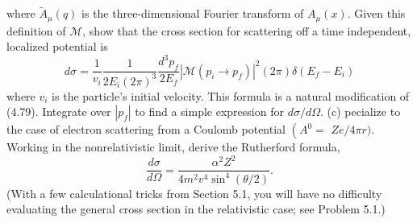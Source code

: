 \documentclass[hyperref, a4paper]{article}
\begin{document}
where $\widetilde{A}_{\mu}(q)$ is the three-dimensional Fourier transform of $A_{\mu}(x)$. Given this definition of $\mathcal{M}$, show that the cross section for scattering off a time independent, localized potential is
\begin{equation}
    d \sigma=\frac{1}{v_{i}} \frac{1}{2 E_{i}(2 \pi)^{3}} \frac{d^{3} p_{f}}{2 E_{f}}\left|\mathcal{M}\left(p_{i} \rightarrow p_{f}\right)\right|^{2}(2 \pi) \delta\left(E_{f}-E_{i}\right)
    \label{eq:single-cross-section}
\end{equation}
where $v_{i}$ is the particle's initial velocity. This formula is a natural modification of (4.79). Integrate over $\left|p_{f}\right|$ to find a simple expression for $d \sigma / d \Omega$.
(c) pecialize to the case of electron scattering from a Coulomb potential $\left(A^{0}=\right.$ $Z e / 4 \pi r)$. Working in the nonrelativistic limit, derive the Rutherford formula,
\begin{equation}
    \frac{d \sigma}{d \Omega}=\frac{\alpha^{2} Z^{2}}{4 m^{2} v^{4} \sin ^{4}(\theta / 2)}.
    \label{eq:rutherford}
\end{equation}
(With a few calculational tricks from Section 5.1, you will have no difficulty evaluating the general cross section in the relativistic case; see Problem 5.1.)
\end{document}
